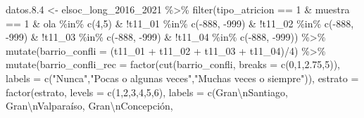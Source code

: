 \documentclass[
  12pt,
]{book}
\newenvironment{Shaded}{\begin{snugshade}}{\end{snugshade}}
\newcommand{\AttributeTok}[1]{\textcolor[rgb]{0.77,0.63,0.00}{#1}}
\newcommand{\DecValTok}[1]{\textcolor[rgb]{0.00,0.00,0.81}{#1}}
\newcommand{\FloatTok}[1]{\textcolor[rgb]{0.00,0.00,0.81}{#1}}
\newcommand{\FunctionTok}[1]{\textcolor[rgb]{0.00,0.00,0.00}{#1}}
\newcommand{\NormalTok}[1]{#1}
\newcommand{\OtherTok}[1]{\textcolor[rgb]{0.56,0.35,0.01}{#1}}
\newcommand{\SpecialCharTok}[1]{\textcolor[rgb]{0.00,0.00,0.00}{#1}}
\newcommand{\StringTok}[1]{\textcolor[rgb]{0.31,0.60,0.02}{#1}}
\begin{document}
\begin{Shaded}
\begin{Highlighting}[]
\NormalTok{datos.}\FloatTok{8.4} \OtherTok{\textless{}{-}}\NormalTok{ elsoc\_long\_2016\_2021 }\SpecialCharTok{\%\textgreater{}\%} 
  \FunctionTok{filter}\NormalTok{(tipo\_atricion }\SpecialCharTok{==} \DecValTok{1} \SpecialCharTok{\&}\NormalTok{ muestra }\SpecialCharTok{==} \DecValTok{1} \SpecialCharTok{\&}\NormalTok{ ola }\SpecialCharTok{\%in\%} \FunctionTok{c}\NormalTok{(}\DecValTok{4}\NormalTok{,}\DecValTok{5}\NormalTok{) }\SpecialCharTok{\&} \SpecialCharTok{!}\NormalTok{t11\_01 }\SpecialCharTok{\%in\%} \FunctionTok{c}\NormalTok{(}\SpecialCharTok{{-}}\DecValTok{888}\NormalTok{, }\SpecialCharTok{{-}}\DecValTok{999}\NormalTok{) }\SpecialCharTok{\&}
           \SpecialCharTok{!}\NormalTok{t11\_02 }\SpecialCharTok{\%in\%} \FunctionTok{c}\NormalTok{(}\SpecialCharTok{{-}}\DecValTok{888}\NormalTok{, }\SpecialCharTok{{-}}\DecValTok{999}\NormalTok{) }\SpecialCharTok{\&} \SpecialCharTok{!}\NormalTok{t11\_03 }\SpecialCharTok{\%in\%} \FunctionTok{c}\NormalTok{(}\SpecialCharTok{{-}}\DecValTok{888}\NormalTok{, }\SpecialCharTok{{-}}\DecValTok{999}\NormalTok{) }\SpecialCharTok{\&} \SpecialCharTok{!}\NormalTok{t11\_04 }\SpecialCharTok{\%in\%} \FunctionTok{c}\NormalTok{(}\SpecialCharTok{{-}}\DecValTok{888}\NormalTok{, }\SpecialCharTok{{-}}\DecValTok{999}\NormalTok{)) }\SpecialCharTok{\%\textgreater{}\%} 
  \FunctionTok{mutate}\NormalTok{(}\AttributeTok{barrio\_confli =}\NormalTok{ (t11\_01 }\SpecialCharTok{+}\NormalTok{ t11\_02 }\SpecialCharTok{+}\NormalTok{ t11\_03 }\SpecialCharTok{+}\NormalTok{ t11\_04)}\SpecialCharTok{/}\DecValTok{4}\NormalTok{) }\SpecialCharTok{\%\textgreater{}\%}
  \FunctionTok{mutate}\NormalTok{(}\AttributeTok{barrio\_confli\_rec =} \FunctionTok{factor}\NormalTok{(}\FunctionTok{cut}\NormalTok{(barrio\_confli, }\AttributeTok{breaks =} \FunctionTok{c}\NormalTok{(}\DecValTok{0}\NormalTok{,}\DecValTok{1}\NormalTok{,}\FloatTok{2.75}\NormalTok{,}\DecValTok{5}\NormalTok{)),}
         \AttributeTok{labels =} \FunctionTok{c}\NormalTok{(}\StringTok{"Nunca"}\NormalTok{,}\StringTok{"Pocas o algunas veces"}\NormalTok{,}\StringTok{"Muchas veces o siempre"}\NormalTok{)),}
         \AttributeTok{estrato =} \FunctionTok{factor}\NormalTok{(estrato, }\AttributeTok{levels =} \FunctionTok{c}\NormalTok{(}\DecValTok{1}\NormalTok{,}\DecValTok{2}\NormalTok{,}\DecValTok{3}\NormalTok{,}\DecValTok{4}\NormalTok{,}\DecValTok{5}\NormalTok{,}\DecValTok{6}\NormalTok{),}
         \AttributeTok{labels =} \FunctionTok{c}\NormalTok{(}\StringTok{\textquotesingle{}Gran}\SpecialCharTok{\textbackslash{}n}\StringTok{Santiago\textquotesingle{}}\NormalTok{, }\StringTok{\textquotesingle{}Gran}\SpecialCharTok{\textbackslash{}n}\StringTok{Valparaíso\textquotesingle{}}\NormalTok{, }\StringTok{\textquotesingle{}Gran}\SpecialCharTok{\textbackslash{}n}\StringTok{Concepción\textquotesingle{}}\NormalTok{, }

\end{Highlighting}
\end{Shaded}
\end{document}

